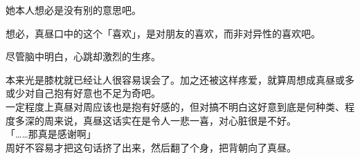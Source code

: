 她本人想必是没有别的意思吧。

想必，真昼口中的这个「喜欢」，是对朋友的喜欢，而非对异性的喜欢吧。

尽管脑中明白，心跳却激烈的生疼。

本来光是膝枕就已经让人很容易误会了。加之还被这样疼爱，就算周想成真昼或多或少对自己抱有好意也不足为奇吧。\\

一定程度上真昼对周应该也是抱有好感的，但对搞不明白这好意到底是何种类、程度多深的周来说，真昼这话实在是令人一悲一喜，对心脏很是不好。\\

「……那真是感谢啊」\\

周好不容易才把这句话挤了出来，然后翻了个身，把背朝向了真昼。
